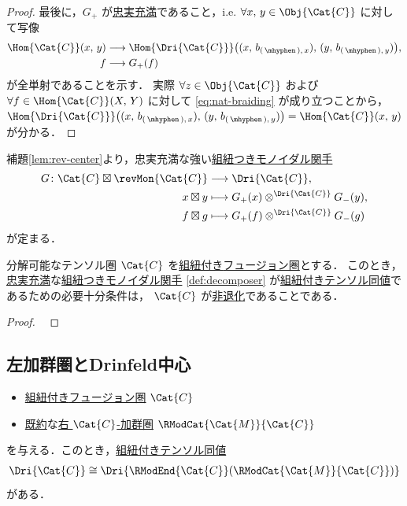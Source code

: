 \documentclass[TQFT_main]{subfiles}
\begin{document}
\begin{proof}
    最後に，$G_+$ が\hyperref[def:faithful]{忠実充満}であること，i.e. $\forall x,\, y \in \Obj{\Cat{C}}$ に対して写像
    \begin{align}
        \Hom{\Cat{C}} (x,\, y) &\lto \Hom{\Dri{\Cat{C}}} \bigl( (x,\, b_{(\, \mhyphen \,),\, x}),\, (y,\, b_{(\, \mhyphen \,),\, y}) \bigr), \\
        f &\lto G_+(f)
    \end{align}
    が全単射であることを示す．
    実際 $\forall z \in \Obj{\Cat{C}}$ および $\forall f \in \Hom{\Cat{C}} (X,\, Y)$ に対して \eqref{eq:nat-braiding} が成り立つことから，$\Hom{\Dri{\Cat{C}}} \bigl( (x,\, b_{(\, \mhyphen \,),\, x}),\, (y,\, b_{(\, \mhyphen \,),\, y}) \bigr) = \Hom{\Cat{C}} (x,\, y)$ が分かる．
\end{proof}

補題\ref{lem:rev-center}より，忠実充満な強い\hyperref[def:braided-monoidal-functor]{組紐つきモノイダル関手}
\begin{align}
    \label{def:decomposer}
    G \colon \Cat{C} \boxtimes \revMon{\Cat{C}} &\lto \Dri{\Cat{C}}, \\
    x \boxtimes y &\lmto G_+(x) \otimes^{\Dri{\Cat{C}}} G_-(y), \\
    f \boxtimes g &\lmto G_+(f) \otimes^{\Dri{\Cat{C}}} G_-(g)
\end{align}
が定まる．

\begin{mytheo}[label=thm:factorizable]{分解可能なテンソル圏}
    $\Cat{C}$ を\hyperref[redef:braided-monoidal]{組紐付き}\hyperref[def:tensorfusion-cat]{フュージョン圏}とする．
    このとき，\hyperref[def:faithful]{忠実充満}な\hyperref[def:braided-monoidal-functor]{組紐つきモノイダル関手} \eqref{def:decomposer} が\hyperref[def:braided-monoidal-functor]{組紐付きテンソル同値}であるための必要十分条件は，
    $\Cat{C}$ が\hyperref[def:nondegen-BFC]{非退化}であることである．
\end{mytheo}

\begin{proof}
    ~\cite[Proposition 3.7]{DGNO2009BFC}
\end{proof}

\subsection{左加群圏とDrinfeld中心}

\begin{mytheo}[label=thm:module-center]{}
    \begin{itemize}
        \item \hyperref[redef:braided-monoidal]{組紐付き}\hyperref[def:tensorfusion-cat]{フュージョン圏} $\Cat{C}$
        \item \hyperref[def:modulecat-indecomposable]{既約}な\hyperref[def:modulecat]{右 $\Cat{C}$-加群圏} $\RModCat{\Cat{M}}{\Cat{C}}$
    \end{itemize}
    を与える．このとき，\hyperref[def:braided-monoidal-functor]{組紐付きテンソル同値}
    \begin{align}
        \Dri{\Cat{C}} \cong \Dri{\RModEnd{\Cat{C}}(\RModCat{\Cat{M}}{\Cat{C}})}
    \end{align}
    がある．
\end{mytheo}
\end{document}
